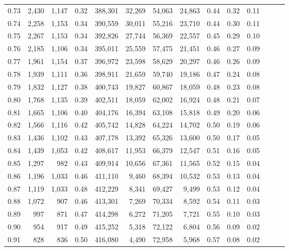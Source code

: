 \begin{tabular}{rrrrrrrrrrrrrr}
0.73 &  2,430 &  1,147 &  0.32 &  388,301 &   32,269 &  54,063 &  24,863 &  0.44 &  0.32 &      0.11 \\
0.74 &  2,258 &  1,153 &  0.34 &  390,559 &   30,011 &  55,216 &  23,710 &  0.44 &  0.30 &      0.11 \\
0.75 &  2,267 &  1,153 &  0.34 &  392,826 &   27,744 &  56,369 &  22,557 &  0.45 &  0.29 &      0.10 \\
0.76 &  2,185 &  1,106 &  0.34 &  395,011 &   25,559 &  57,475 &  21,451 &  0.46 &  0.27 &      0.09 \\
0.77 &  1,961 &  1,154 &  0.37 &  396,972 &   23,598 &  58,629 &  20,297 &  0.46 &  0.26 &      0.09 \\
0.78 &  1,939 &  1,111 &  0.36 &  398,911 &   21,659 &  59,740 &  19,186 &  0.47 &  0.24 &      0.08 \\
0.79 &  1,832 &  1,127 &  0.38 &  400,743 &   19,827 &  60,867 &  18,059 &  0.48 &  0.23 &      0.08 \\
0.80 &  1,768 &  1,135 &  0.39 &  402,511 &   18,059 &  62,002 &  16,924 &  0.48 &  0.21 &      0.07 \\
0.81 &  1,665 &  1,106 &  0.40 &  404,176 &   16,394 &  63,108 &  15,818 &  0.49 &  0.20 &      0.06 \\
0.82 &  1,566 &  1,116 &  0.42 &  405,742 &   14,828 &  64,224 &  14,702 &  0.50 &  0.19 &      0.06 \\
0.83 &  1,436 &  1,102 &  0.43 &  407,178 &   13,392 &  65,326 &  13,600 &  0.50 &  0.17 &      0.05 \\
0.84 &  1,439 &  1,053 &  0.42 &  408,617 &   11,953 &  66,379 &  12,547 &  0.51 &  0.16 &      0.05 \\
0.85 &  1,297 &    982 &  0.43 &  409,914 &   10,656 &  67,361 &  11,565 &  0.52 &  0.15 &      0.04 \\
0.86 &  1,196 &  1,033 &  0.46 &  411,110 &    9,460 &  68,394 &  10,532 &  0.53 &  0.13 &      0.04 \\
0.87 &  1,119 &  1,033 &  0.48 &  412,229 &    8,341 &  69,427 &   9,499 &  0.53 &  0.12 &      0.04 \\
0.88 &  1,072 &    907 &  0.46 &  413,301 &    7,269 &  70,334 &   8,592 &  0.54 &  0.11 &      0.03 \\
0.89 &    997 &    871 &  0.47 &  414,298 &    6,272 &  71,205 &   7,721 &  0.55 &  0.10 &      0.03 \\
0.90 &    954 &    917 &  0.49 &  415,252 &    5,318 &  72,122 &   6,804 &  0.56 &  0.09 &      0.02 \\
0.91 &    828 &    836 &  0.50 &  416,080 &    4,490 &  72,958 &   5,968 &  0.57 &  0.08 &      0.02 \\

\end{tabular}
